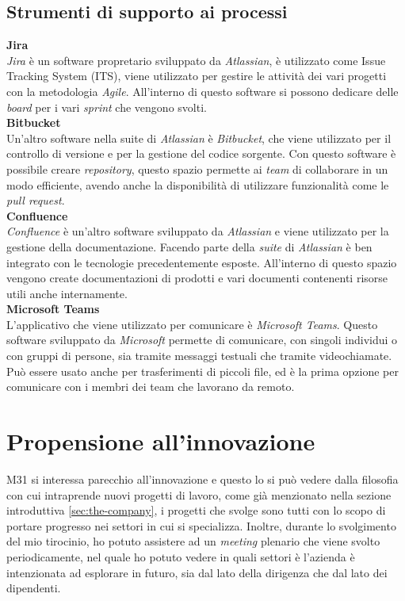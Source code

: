 \subsection{Strumenti di supporto ai processi}\noindent
\textbf{Jira}\\
\textit{Jira} è un software propretario sviluppato da \textit{Atlassian}, è utilizzato come Issue Tracking System (ITS), viene utilizzato per gestire le attività dei vari progetti con la metodologia \textit{Agile}.
All'interno di questo software si possono dedicare delle \textit{board} per i vari \textit{sprint} che vengono svolti.\\
\textbf{Bitbucket}\\
Un'altro software nella suite di \textit{Atlassian} è \textit{Bitbucket}, che viene utilizzato per il controllo di versione e per la gestione del codice sorgente.
Con questo software è possibile creare \textit{repository}, questo spazio permette ai \textit{team} di collaborare in un modo efficiente, avendo anche la disponibilità di utilizzare funzionalità come le \textit{pull request}.\\
\textbf{Confluence}\\
\textit{Confluence} è un'altro software sviluppato da \textit{Atlassian} e viene utilizzato per la gestione della documentazione.
Facendo parte della \textit{suite} di \textit{Atlassian} è ben integrato con le tecnologie precedentemente esposte.
All'interno di questo spazio vengono create documentazioni di prodotti e vari documenti contenenti risorse utili anche internamente.\\
\textbf{Microsoft Teams}\\
L'applicativo che viene utilizzato per comunicare è \textit{Microsoft Teams}. Questo software sviluppato da \textit{Microsoft} permette di comunicare, con singoli individui o con gruppi di persone, sia tramite messaggi testuali che tramite videochiamate.
Può essere usato anche per trasferimenti di piccoli file, ed è la prima opzione per comunicare con i membri dei team che lavorano da remoto.

\section{Propensione all'innovazione}\noindent
M31 si interessa parecchio all'innovazione e questo lo si può vedere dalla filosofia con cui intraprende nuovi progetti di lavoro, come già menzionato nella sezione introduttiva \ref{sec:the-company}, i progetti che svolge sono tutti con lo scopo di portare progresso nei settori in cui si specializza.
Inoltre, durante lo svolgimento del mio tirocinio, ho potuto assistere ad un \textit{meeting} plenario che viene svolto periodicamente, nel quale ho potuto vedere in quali settori è l'azienda è intenzionata ad esplorare in futuro, sia dal lato della dirigenza che dal lato dei dipendenti.